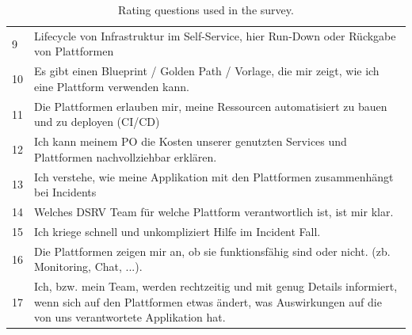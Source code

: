 \documentclass[a4paper,12pt]{article}
\begin{document}
\begin{table}[!htbp]
\begin{center}
\begin{tabularx}{\textwidth}{lX}
                9  & Lifecycle von Infrastruktur im Self-Service, hier Run-Down oder Rückgabe von Plattformen                                                                                              \\
                10 & Es gibt einen Blueprint / Golden Path / Vorlage, die mir zeigt, wie ich eine Plattform verwenden kann.                                                                                \\
                11 & Die Plattformen erlauben mir, meine Ressourcen automatisiert zu bauen und zu deployen (CI/CD)                                                                                         \\
                12 & Ich kann meinem PO die Kosten unserer genutzten Services und Plattformen nachvollziehbar erklären.                                                                                    \\
                13 & Ich verstehe, wie meine Applikation mit den Plattformen zusammenhängt bei Incidents                                                                                                   \\
                14 & Welches DSRV Team für welche Plattform verantwortlich ist, ist mir klar.                                                                                                              \\
                15 & Ich kriege schnell und unkompliziert Hilfe im Incident Fall.                                                                                                                          \\
                16 & Die Plattformen zeigen mir an, ob sie funktionsfähig sind oder nicht. (zb. Monitoring, Chat, ...).                                                                                    \\
                17 & Ich, bzw. mein Team, werden rechtzeitig und mit genug Details informiert, wenn sich auf den Plattformen etwas ändert, was Auswirkungen auf die von uns verantwortete Applikation hat. \\
                \bottomrule
            \end{tabularx}
        \end{center}
        \caption{\label{tab:ratingquestionstable} Rating questions used in the survey.}
    \end{table}
\end{document}
